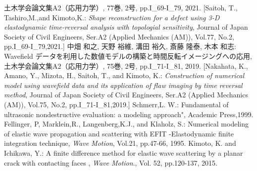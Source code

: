 \documentclass[jscefinal]{jjsce}%
\begin{document}
\begin{thebibliography}{9}
	土木学会論文集A2（応用力学）, 77巻, 2号, pp.I\_69-I\_79, 2021.
	[Saitoh, T., Tashiro,M.,and Kimoto,K.:
	\textit{Shape reconstruction for a defect using 3-D elastodynamic time-reversal analysis with topologial sensitivity}, 
	Journal of Japan Society of Civil Engineers, Ser.A2 (Applied Mechanics (AM)), 
	Vol.77, No.2, pp.I\_69-I\_79,2021.] 
	中畑 和之, 天野 裕維, 溝田 裕久, 斎藤 隆泰, 木本 和志:
	Wavefield データを利用した数値モデルの構築と時間反転イメージングへの応用,
	土木学会論文集A2（応用力学）, 75巻, 2号, pp.I\_71-I\_81, 2019.
	[Nakahata, K., Amano, Y., Mizota, H., Saitoh, T., and Kimoto, K.:
	\textit{Construction of numerical model using wavefield data and its 
	application of flaw imaging by time reversal method},
	Journal of Japan Society of Civil Engineers, Ser.A2 (Applied Mechanics (AM)), 
	Vol.75, No.2, pp.I\_71-I\_81,2019.] 
	Schmerr,L. W.:
	Fundamental of ultrasonic nondestructive evaluation: a modeling approach", Academic Press,1999.	
	Fellinger, P, Marklein,R., Langenberg,K.J., and Klaholz, S.: 
	Numerical modeling of elastic wave propagation and scattering with EFIT 
	-Elastodynamic finite integration technique, 
	\textit{ Wave Motion}, Vol.21, pp.47-66, 1995.
	Kimoto, K. and Ichikawa, Y.:
	A finite difference method for elastic wave scattering by a planar crack with contacting faces
	, \textit{Wave Motion}., Vol. 52, pp.120-137, 2015.
\end{thebibliography}
\end{document}

